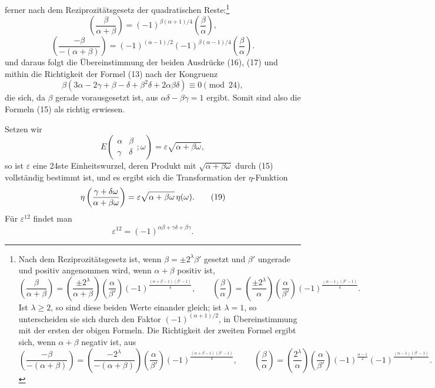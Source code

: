 \documentclass[11pt]{article}
\newcommand{\Jac}[2]{\left(\frac{#1}{#2}\right)}
\begin{document}
ferner nach dem Reziprozitätsgesetz der quadratischen Reste:\footnote{Nach dem Reziprozitätsgesetz ist, wenn $\beta=\pm2^\lambda\beta'$ gesetzt und $\beta'$ ungerade und positiv angenommen wird, wenn $\alpha+\beta$ positiv ist,
\[
\Jac{\beta}{\alpha+\beta}=\Jac{\pm2^\lambda}{\alpha+\beta}\Jac{\alpha}{\beta'}(-1)^{\frac{(\alpha+\beta-1)(\beta'-1)}{4}},
\qquad
\Jac{\beta}{\alpha}=\Jac{\pm2^\lambda}{\alpha}\Jac{\alpha}{\beta'}(-1)^{\frac{(\alpha-1)(\beta'-1)}{4}}.
\]
Ist $\lambda\ge2$, so sind diese beiden Werte einander gleich; ist $\lambda=1$, so unterscheiden sie sich durch den Faktor $(-1)^{(\alpha+1)/2}$, in Übereinstimmung mit der ersten der obigen Formeln. Die Richtigkeit der zweiten Formel ergibt sich, wenn $\alpha+\beta$ negativ ist, aus
\[
\Jac{-\beta}{-(\alpha+\beta)}=\Jac{-2^\lambda}{-(\alpha+\beta)}\Jac{\alpha}{\beta'}(-1)^{\frac{(\alpha+\beta-1)(\beta'-1)}{4}},
\qquad
\Jac{\beta}{\alpha}=\Jac{2^\lambda}{\alpha}\Jac{\alpha}{\beta'}(-1)^{\frac{\alpha-1}{2}}(-1)^{\frac{(\alpha-1)(\beta'-1)}{4}}.
\]
}
\[
\Jac{\beta}{\alpha+\beta}=(-1)^{\beta(\alpha+1)/4}\Jac{\beta}{\alpha},
\]
\[
\Jac{-\beta}{-(\alpha+\beta)}=(-1)^{(\alpha-1)/2}(-1)^{\beta(\alpha-1)/4}\Jac{\beta}{\alpha}.
\]
und daraus folgt die Übereinstimmung der beiden Ausdrücke (16), (17) und mithin die Richtigkeit der Formel (13) nach der Kongruenz
\[
\beta(3\alpha-2\gamma+\beta-\delta+\beta^2\delta+2\alpha\beta\delta)
\equiv0\pmod{24},
\]
die sich, da $\beta$ gerade vorausgesetzt ist, aus $\alpha\delta-\beta\gamma=1$ ergibt. Somit sind also die Formeln (15) als richtig erwiesen.

Setzen wir
\begin{equation}
E\left(\begin{matrix}\alpha&\beta\\\gamma&\delta\end{matrix};\omega\right)
=\varepsilon\sqrt{\alpha+\beta\omega},
\tag{18}
\end{equation}
so ist $\varepsilon$ eine 24ste Einheitswurzel, deren Produkt mit $\sqrt{\alpha+\beta\omega}$ durch (15) vollständig bestimmt ist, und es ergibt sich die Transformation der $\eta$-Funktion
\begin{equation}
\eta\left({\gamma+\delta\omega\over\alpha+\beta\omega}\right)
=\varepsilon\sqrt{\alpha+\beta\omega}\,\eta(\omega).
\tag{19}
\end{equation}
Für $\varepsilon^{12}$ findet man
\begin{equation}
\varepsilon^{12}=(-1)^{\alpha\beta+\gamma\delta+\beta\gamma}. 
\tag{20}
\end{equation}
\end{document}
